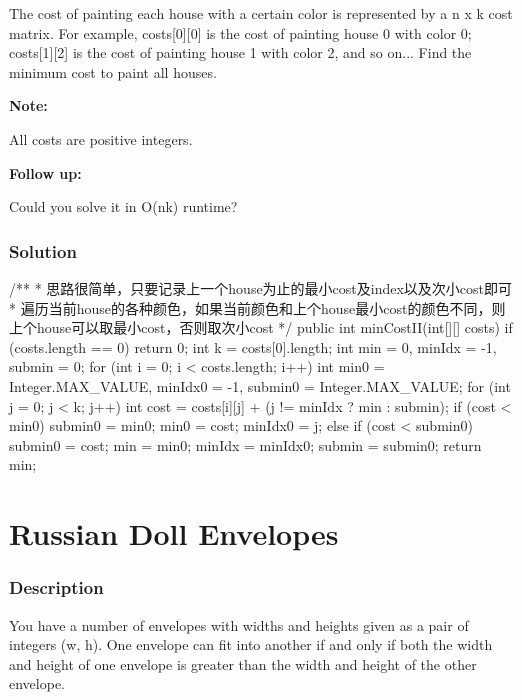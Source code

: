 The cost of painting each house with a certain color is represented by a n x k cost matrix. For example, costs[0][0] is the cost of painting house 0 with color 0; costs[1][2] is the cost of painting house 1 with color 2, and so on... Find the minimum cost to paint all houses.

\textbf{Note:}

All costs are positive integers.

\textbf{Follow up:}

Could you solve it in O(nk) runtime?

\subsubsection{Solution}

\begin{Code}
/**
 * 思路很简单，只要记录上一个house为止的最小cost及index以及次小cost即可
 * 遍历当前house的各种颜色，如果当前颜色和上个house最小cost的颜色不同，则上个house可以取最小cost，否则取次小cost
 */
public int minCostII(int[][] costs) {
    if (costs.length == 0) {
        return 0;
    }
    int k = costs[0].length;
    int min = 0, minIdx = -1, submin = 0;
    for (int i = 0; i < costs.length; i++) {
        int min0 = Integer.MAX_VALUE, minIdx0 = -1, submin0 = Integer.MAX_VALUE;
        for (int j = 0; j < k; j++) {
            int cost = costs[i][j] + (j != minIdx ? min : submin);
            if (cost < min0) {
                submin0 = min0;
                min0 = cost;
                minIdx0 = j;
            } else if (cost < submin0) {
                submin0 = cost;
            }
        }
        min = min0; minIdx = minIdx0; submin = submin0;
    }
    return min;
}
\end{Code}

\newpage

\section{Russian Doll Envelopes} %

\subsubsection{Description}
You have a number of envelopes with widths and heights given as a pair of integers (w, h). One envelope can fit into another if and only if both the width and height of one envelope is greater than the width and height of the other envelope.

